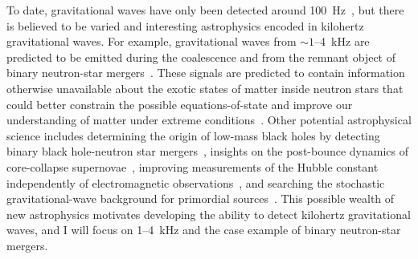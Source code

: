 To date, gravitational waves have only been detected around 100~Hz~\cite{GWTC-2:2020}, but there is believed to be varied and interesting astrophysics encoded in kilohertz gravitational waves.
For example, gravitational waves from $\sim1$--4~kHz are predicted to be emitted during the coalescence and from the remnant object of binary neutron-star mergers~\cite{PhysRevD.100.104029}.
These signals are predicted to contain information otherwise unavailable about the exotic states of matter inside neutron stars that could better constrain the possible equations-of-state and improve our understanding of matter under extreme conditions~\cite{PhysRevD.100.104029,miaoDesignGravitationalWaveDetectors2018}. %
Other potential astrophysical science includes determining the origin of low-mass black holes by detecting binary black hole-neutron star mergers~\cite{PhysRevD.79.044030}, insights on the post-bounce dynamics of core-collapse supernovae~\cite{Ott_2009}, improving measurements of the Hubble constant independently of electromagnetic observations~\cite{PhysRevX.4.041004}, and searching the stochastic gravitational-wave background for primordial sources~\cite{miaoDesignGravitationalWaveDetectors2018}.
This possible wealth of new astrophysics motivates developing the ability to detect kilohertz gravitational waves, and I will focus on 1--4~kHz and the case example of binary neutron-star mergers.




